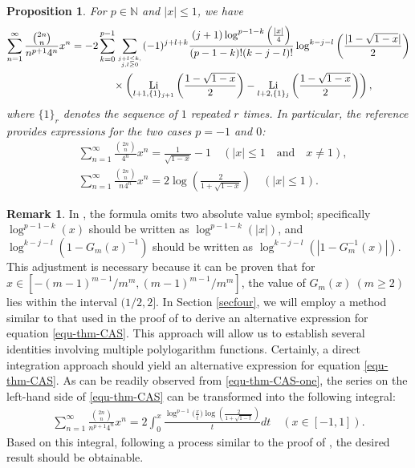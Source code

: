 \documentclass[11pt]{article}
\DeclareMathOperator{\Li}{Li}
\def\N{\mathbb{N}}
\theoremstyle{plain}
\newtheorem{pro}[thm]{Proposition}
\theoremstyle{definition}
\newtheorem{re}[thm]{Remark}
\begin{document}
\begin{pro}\label{thm-CAS} For $p\in \N$ and $|x|\leq 1$, we have
\begin{align}\label{equ-thm-CAS}
\sum_{n=1}^\infty \frac{\binom{2n}{n}}{n^{p+1}4^n}x^n&=-2\sum_{k=0}^{p-1}\sum_{j+l\leq k,\atop j,l\geq 0} (-1)^{j+l+k}\frac{(j+1)\log^{p-1-k}\Big(\frac{|x|}{4}\Big)}{(p-1-k)!(k-j-l)!}\log^{k-j-l}\left(\frac{|1-\sqrt{1-x}|}{2}\right)\nonumber\\
&\qquad\qquad\times\left( \Li_{l+1,\{1\}_{j+1}}\left(\frac{1-\sqrt{1-x}}{2}\right)-\Li_{l+2,\{1\}_{j}}\left(\frac{1-\sqrt{1-x}}{2}\right)\right),
\end{align}
where $\{1\}_r$ denotes the sequence of $1$ repeated $r$ times. In particular, the reference \cite{Chen2016} provides expressions for the two cases $p=-1$ and $0$:
\begin{align}
&\sum_{n=1}^\infty \frac{\binom{2n}{n}}{4^n}x^n=\frac1{\sqrt{1-x}}-1\quad (|x|\leq 1\quad\text{and}\quad x\neq 1),\label{equ-thm-CAS-zero}\\
&\sum_{n=1}^\infty \frac{\binom{2n}{n}}{n^{}4^n}x^n=2\log\left(\frac{2}{1+\sqrt{1-x}}\right)\quad (|x|\leq 1).\label{equ-thm-CAS-one}
\end{align}
\end{pro}
\begin{re}
In \cite[Theorem 3.8]{WLX2022}, the formula omits two absolute value symbol; specifically $\log^{p-1-k}(x)$ should be written as $\log^{p-1-k}(|x|)$, and $\log^{k-j-l} (1-G_m(x)^{-1})$ should be written as $\log^{k-j-l} (|1-G_m^{-1}(x)|)$. This adjustment is necessary because it can be proven that for $x \in [-(m-1)^{m-1}/m^m, (m-1)^{m-1}/m^m]$, the value of $G_m(x)\ (m\geq 2)$ lies within the interval $(1/2, 2]$. In Section \ref{secfour}, we will employ a method similar to that used in the proof of \cite[Theorem 3.8]{WLX2022} to derive an alternative expression for equation \eqref{equ-thm-CAS}. This approach will allow us to establish several identities involving multiple polylogarithm functions. Certainly, a direct integration approach should yield an alternative expression for equation \eqref{equ-thm-CAS}. As can be readily observed from \eqref{equ-thm-CAS-one}, the series on the left-hand side of \eqref{equ-thm-CAS} can be transformed into the following integral:
\begin{align}
\sum_{n=1}^\infty \frac{\binom{2n}{n}}{n^{p+1}4^n}x^n=2\int_0^x \frac{\log^{p-1}\Big(\frac{x}{t}\Big)\log\left(\frac{2}{1+\sqrt{1-t}}\right)}{t}dt\quad (x\in[-1,1]).
\end{align}
Based on this integral, following a process similar to the proof of \cite[Theorem 2.2]{WX2021}, the desired result should be obtainable.
\end{re}
\end{document}
